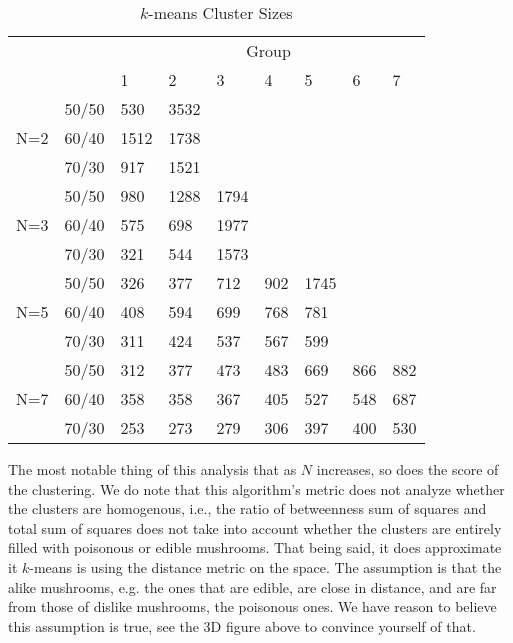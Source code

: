 \documentclass{article}
\begin{document}
\begin{center}
\begin{table}[]
\centering
\caption{$k$-means Cluster Sizes}
\label{my-label}
\begin{tabular}{|c|l|l|l|l|l|l|l|l|}
\hline
\multicolumn{2}{|c|}{\multirow{2}{*}{}} & \multicolumn{7}{c|}{Group}                 \\ \cline{3-9} 
\multicolumn{2}{|c|}{}                  & 1   & 2    & 3    & 4   & 5    & 6   & 7   \\ \hline
\multirow{3}{*}{N=2}       & 50/50      & 530 & 3532 &      &     &      &     &     \\ \cline{2-9} 
                           & 60/40      & 1512 & 1738 &      &     &      &     &     \\ \cline{2-9} 
                           & 70/30      & 917 & 1521 &      &     &      &     &     \\ \hline
\multirow{3}{*}{N=3}       & 50/50      & 980 & 1288  & 1794 &     &      &     &     \\ \cline{2-9} 
                           & 60/40      & 575 & 698  & 1977 &     &      &     &     \\ \cline{2-9} 
                           & 70/30      & 321 & 544  & 1573 &     &      &     &     \\ \hline
\multirow{3}{*}{N=5}       & 50/50      & 326 & 377  & 712  & 902 & 1745 &     &     \\ \cline{2-9} 
                           & 60/40      & 408 & 594  & 699  & 768 & 781  &     &     \\ \cline{2-9} 
                           & 70/30      & 311 & 424  & 537  & 567 & 599  &     &     \\ \hline
\multirow{3}{*}{N=7}       & 50/50      & 312 & 377  & 473  & 483 & 669  & 866 & 882 \\ \cline{2-9} 
                           & 60/40      & 358 & 358  & 367  & 405 & 527  & 548 & 687 \\ \cline{2-9} 
                           & 70/30      & 253 & 273  & 279  & 306 & 397  & 400 & 530 \\ \hline
\end{tabular}
\end{table}
\end{center}

The most notable thing of this analysis that as $N$ increases, so does the score of the clustering. We do note that this algorithm's metric does not analyze whether the clusters are homogenous, i.e., the ratio of betweenness sum of squares and total sum of squares does not take into account whether the clusters are entirely filled with poisonous or edible mushrooms. That being said, it does approximate it $k$-means is using the distance metric on the space. The assumption is that the alike mushrooms, e.g. the ones that are edible, are close in distance, and are far from those of dislike mushrooms, the poisonous ones. We have reason to believe this assumption is true, see the 3D figure above to convince yourself of that.
\end{document}
